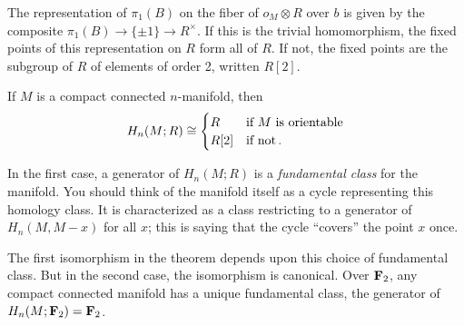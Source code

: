 The representation of $\pi_1(B)$ on the fiber of $o_M\otimes R$ over $b$
is given by the composite $\pi_1(B)\to\{\pm1\}\to R^\times$. If this is the
trivial homomorphism, the fixed points of this representation on $R$ 
form all of $R$. If not, the fixed points are the subgroup of $R$
of elements of order 2, written $R[2]$.
\begin{corollary}
If $M$ is a compact connected $n$-manifold, then 
\[
H_n(M;R)\cong\begin{cases}R & \hbox{if $M$ is orientable} \\ 
R[2] & \hbox{if not}\,.
\end{cases}
\]
\end{corollary}
In the first case, a generator of $H_n(M;R)$ is a {\em fundamental class} 
for the manifold. You should think of the manifold itself as a cycle
representing this homology class. It is characterized as a class restricting
to a generator of $H_n(M,M-x)$ for all $x$; this is saying that the cycle
``covers'' the point $x$ once.

The first isomorphism in the theorem 
depends upon this choice of fundamental class. But in the second case,
the isomorphism is canonical. Over $\mathbf F_2$, any compact connected manifold 
has a unique fundamental class, the generator of $H_n(M;\mathbf F_2)=\mathbf F_2$. 

